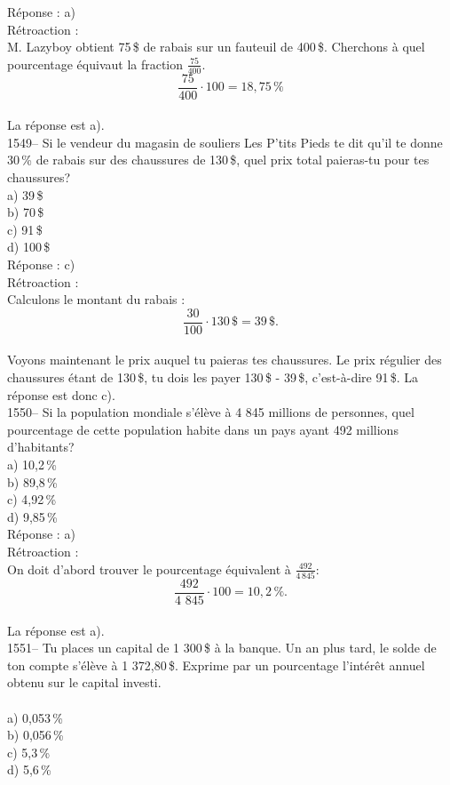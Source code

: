 R\'eponse : a)\\

R\'etroaction :\\
M. Lazyboy obtient 75\,\$ de rabais sur un fauteuil de 400\,\$.
Cherchons \`a quel pourcentage \'equivaut la fraction
$\frac{75}{400}.$
$$\frac{75}{400}\cdot100=18,75\,\%$$\\
La r\'eponse est a).\\

1549-- Si le vendeur du magasin de souliers Les P'tits Pieds te dit
qu'il te donne 30\,\% de rabais sur des chaussures de
130\,\$, quel prix total paieras-tu pour tes chaussures?\\
a) 39\,\$\\
b) 70\,\$\\
c) 91\,\$\\
d) 100\,\$\\

R\'eponse : c)\\

R\'etroaction :\\Calculons le montant du rabais :
$$\frac{30}{100}\cdot130\,\$= 39\,\$.$$\\ Voyons maintenant le prix auquel
tu paieras tes
chaussures. Le prix r\'egulier des
chaussures \'etant de 130\,\$, tu dois les payer 130\,\$ - 39\,\$,
c'est-\`a-dire 91\,\$. La r\'eponse est donc c).\\

1550-- Si la population mondiale s'\'el\`eve \`a 4 845 millions de
personnes, quel pourcentage de cette population habite dans un pays ayant
492 millions d'habitants?\\
a) 10,2\,\%\\
b) 89,8\,\%\\
c) 4,92\,\%\\
d) 9,85\,\%\\

R\'eponse : a)\\

R\'etroaction :\\
On doit d'abord trouver le pourcentage \'equivalent \`a
$\frac{492}{4\,845}: $ \\
$$\frac{492}{4\,\,845}\cdot
100=10,2\,\%.$$\\
La r\'eponse est a).\\

1551-- Tu places un capital de 1 300\,\$ \`a la banque. Un an plus
tard, le solde de ton compte s'\'el\`eve \`a 1 372,80\,\$. Exprime
par un pourcentage
l'int\'er\^et annuel obtenu sur le capital investi.\\\\
a) 0,053\,\%\\
b) 0,056\,\%\\
c) 5,3\,\%\\
d) 5,6\,\%\\

